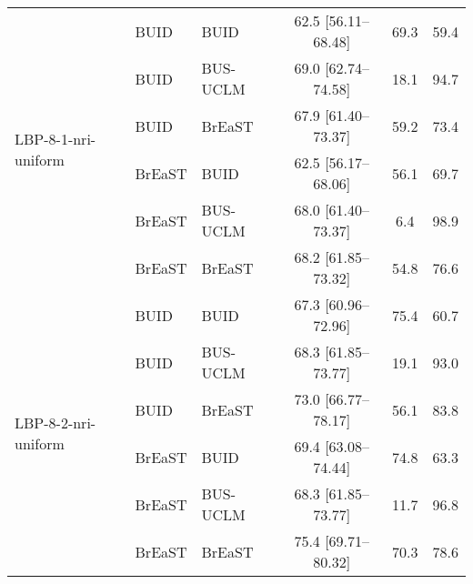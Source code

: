 \begin{tabular}{lllccc}
\midrule
\multirow{6}{*}{LBP-8-1-nri-uniform} & BUID & BUID & 62.5 [56.11--68.48] & 69.3 & 59.4\\ 
 & BUID & BUS-UCLM & 69.0 [62.74--74.58] & 18.1 & 94.7\\ 
 & BUID & BrEaST & 67.9 [61.40--73.37] & 59.2 & 73.4\\ 
 & BrEaST & BUID & 62.5 [56.17--68.06] & 56.1 & 69.7\\ 
 & BrEaST & BUS-UCLM & 68.0 [61.40--73.37] & 6.4 & 98.9\\ 
 & BrEaST & BrEaST & 68.2 [61.85--73.32] & 54.8 & 76.6\\ 
\midrule
\multirow{6}{*}{LBP-8-2-nri-uniform} & BUID & BUID & 67.3 [60.96--72.96] & 75.4 & 60.7\\ 
 & BUID & BUS-UCLM & 68.3 [61.85--73.77] & 19.1 & 93.0\\ 
 & BUID & BrEaST & 73.0 [66.77--78.17] & 56.1 & 83.8\\ 
 & BrEaST & BUID & 69.4 [63.08--74.44] & 74.8 & 63.3\\ 
 & BrEaST & BUS-UCLM & 68.3 [61.85--73.77] & 11.7 & 96.8\\ 
 & BrEaST & BrEaST & 75.4 [69.71--80.32] & 70.3 & 78.6\\ 
\bottomrule
\end{tabular}
